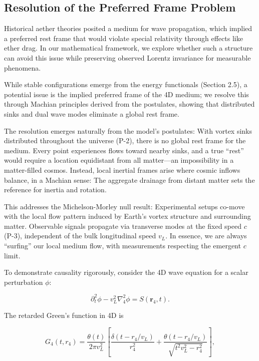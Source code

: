 \subsection{Resolution of the Preferred Frame Problem}

Historical aether theories posited a medium for wave propagation, which implied a preferred rest frame that would violate special relativity through effects like ether drag. In our mathematical framework, we explore whether such a structure can avoid this issue while preserving observed Lorentz invariance for measurable phenomena.

While stable configurations emerge from the energy functionals (Section 2.5), a potential issue is the implied preferred frame of the 4D medium; we resolve this through Machian principles derived from the postulates, showing that distributed sinks and dual wave modes eliminate a global rest frame.

The resolution emerges naturally from the model's postulates: With vortex sinks distributed throughout the universe (P-2), there is no global rest frame for the medium. Every point experiences flows toward nearby sinks, and a true ``rest'' would require a location equidistant from all matter---an impossibility in a matter-filled cosmos. Instead, local inertial frames arise where cosmic inflows balance, in a Machian sense: The aggregate drainage from distant matter sets the reference for inertia and rotation.

This addresses the Michelson-Morley null result: Experimental setups co-move with the local flow pattern induced by Earth's vortex structure and surrounding matter. Observable signals propagate via transverse modes at the fixed speed $c$ (P-3), independent of the bulk longitudinal speed $v_L$. In essence, we are always ``surfing'' our local medium flow, with measurements respecting the emergent $c$ limit.

To demonstrate causality rigorously, consider the 4D wave equation for a scalar perturbation $\phi$:

\begin{equation}
\partial_t^2 \phi - v_L^2 \nabla_4^2 \phi = S(\mathbf{r}_4, t).
\end{equation}

The retarded Green's function in 4D is

\begin{equation}
G_4(t, r_4) = \frac{\theta(t)}{2\pi v_L^2} \left[ \frac{\delta(t - r_4 / v_L)}{r_4^2} + \frac{\theta(t - r_4 / v_L)}{\sqrt{t^2 v_L^2 - r_4^2}} \right],
\end{equation}

